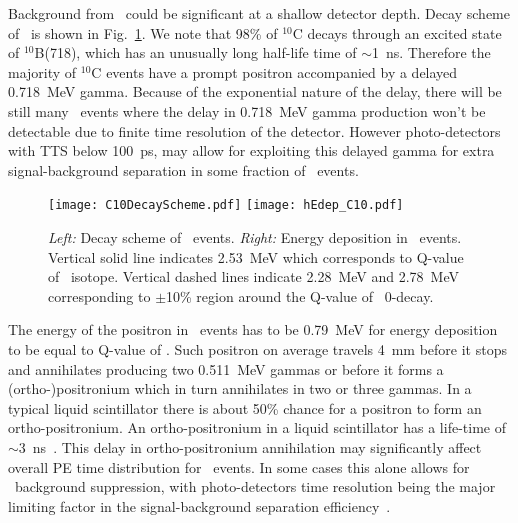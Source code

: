 



Background from \C~could be significant at a shallow detector depth.
Decay scheme of \C~is shown in Fig.~\ref{fig:C10_scheme_and_edep}. We note that 98\% of $^{10}$C decays through an excited state of $^{10}$B(718),
which has an unusually long half-life time of $\sim$1~ns. Therefore the majority of $^{10}$C events have a prompt positron accompanied by 
a delayed 0.718~MeV gamma. Because of the exponential nature of the delay, there will be still many \C~events where the delay in 
0.718~MeV gamma production won't be detectable due to finite time resolution of the detector. However photo-detectors with TTS below 100~ps, 
may allow for exploiting this delayed gamma for extra signal-background separation in some fraction of \C~events.

\begin{figure}[ht]
  \centering
  \texttt{[image: C10DecayScheme.pdf]}
  \texttt{[image: hEdep\_C10.pdf]}
  \caption{\emph{Left:} Decay scheme of \C~events. \emph{Right:} Energy deposition in \C~events. Vertical solid line indicates 2.53~MeV
    which corresponds to Q-value of \Te~isotope. Vertical dashed lines indicate 2.28~MeV and 2.78~MeV corresponding to $\pm$10\% region 
    around the Q-value of \Te~0\nbb-decay.}
\label{fig:C10_scheme_and_edep}
\end{figure}

The energy of the positron in \C~events has to be 0.79~MeV for energy deposition to be equal to Q-value of \Te. Such positron on average 
travels 4~mm before it stops and annihilates producing two 0.511~MeV gammas or before it forms a (ortho-)positronium which in turn annihilates 
in two or three gammas. In a typical liquid scintillator there is about 50\% chance for a positron to form an ortho-positronium. 
An ortho-positronium in a liquid scintillator has a life-time of $\sim$3~ns~\cite{Ortho-positronium}. This delay in ortho-positronium annihilation
may significantly affect overall PE time distribution for \C~events. In some cases this alone allows for \C~background suppression, 
with photo-detectors time resolution being the major limiting factor in the signal-background separation efficiency~\cite{KLZ-use-of-PSD}.

